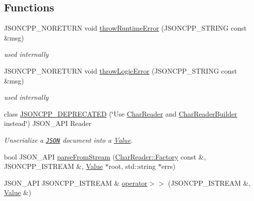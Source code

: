 \subsection*{Functions}
\begin{DoxyCompactItemize}
\item 
\mbox{\label{namespaceJson_a0ab7ff7f99788262d92d9ff3d924e065}} 
J\+S\+O\+N\+C\+P\+P\+\_\+\+N\+O\+R\+E\+T\+U\+RN void \hyperlink{namespaceJson_a0ab7ff7f99788262d92d9ff3d924e065}{throw\+Runtime\+Error} (J\+S\+O\+N\+C\+P\+P\+\_\+\+S\+T\+R\+I\+NG const \&msg)
\begin{DoxyCompactList}\small\item\em used internally \end{DoxyCompactList}\item 
\mbox{\label{namespaceJson_a27790f21f17922fac81e7cd72a5659a5}} 
J\+S\+O\+N\+C\+P\+P\+\_\+\+N\+O\+R\+E\+T\+U\+RN void \hyperlink{namespaceJson_a27790f21f17922fac81e7cd72a5659a5}{throw\+Logic\+Error} (J\+S\+O\+N\+C\+P\+P\+\_\+\+S\+T\+R\+I\+NG const \&msg)
\begin{DoxyCompactList}\small\item\em used internally \end{DoxyCompactList}\item 
class \hyperlink{namespaceJson_a61b556ffe4c70c4492a9dbe4718ec50b}{J\+S\+O\+N\+C\+P\+P\+\_\+\+D\+E\+P\+R\+E\+C\+A\+T\+ED} (\char`\"{}Use \hyperlink{classJson_1_1CharReader}{Char\+Reader} and \hyperlink{classJson_1_1CharReaderBuilder}{Char\+Reader\+Builder} instead\char`\"{}) J\+S\+O\+N\+\_\+\+A\+PI Reader
\begin{DoxyCompactList}\small\item\em Unserialize a \href{http://www.json.org}{\tt J\+S\+ON} document into a \hyperlink{classJson_1_1Value}{Value}. \end{DoxyCompactList}\item 
bool J\+S\+O\+N\+\_\+\+A\+PI \hyperlink{namespaceJson_aab0cf1ecf81d1aeca12be2a416a84352}{parse\+From\+Stream} (\hyperlink{classJson_1_1CharReader_1_1Factory}{Char\+Reader\+::\+Factory} const \&, J\+S\+O\+N\+C\+P\+P\+\_\+\+I\+S\+T\+R\+E\+AM \&, \hyperlink{classJson_1_1Value}{Value} $\ast$root, std\+::string $\ast$errs)
\item 
J\+S\+O\+N\+\_\+\+A\+PI J\+S\+O\+N\+C\+P\+P\+\_\+\+I\+S\+T\+R\+E\+AM \& \hyperlink{namespaceJson_a244ed0996aba750c40c1641c06bba449}{operator$>$$>$} (J\+S\+O\+N\+C\+P\+P\+\_\+\+I\+S\+T\+R\+E\+AM \&, \hyperlink{classJson_1_1Value}{Value} \&)

\end{DoxyCompactItemize}
